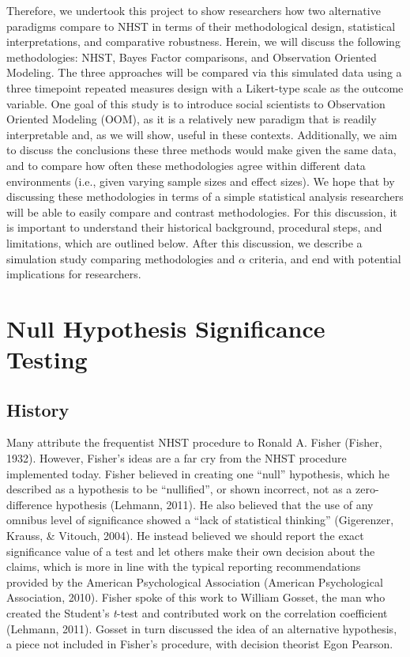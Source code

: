 \documentclass[english,mask,man]{apa6}
\theoremstyle{definition}
\theoremstyle{definition}
\theoremstyle{definition}
\theoremstyle{remark}
\begin{document}
Therefore, we undertook this project to show researchers how two
alternative paradigms compare to NHST in terms of their methodological
design, statistical interpretations, and comparative robustness. Herein,
we will discuss the following methodologies: NHST, Bayes Factor
comparisons, and Observation Oriented Modeling. The three approaches
will be compared via this simulated data using a three timepoint
repeated measures design with a Likert-type scale as the outcome
variable. One goal of this study is to introduce social scientists to
Observation Oriented Modeling (OOM), as it is a relatively new paradigm
that is readily interpretable and, as we will show, useful in these
contexts. Additionally, we aim to discuss the conclusions these three
methods would make given the same data, and to compare how often these
methodologies agree within different data environments (i.e., given
varying sample sizes and effect sizes). We hope that by discussing these
methodologies in terms of a simple statistical analysis researchers will
be able to easily compare and contrast methodologies. For this
discussion, it is important to understand their historical background,
procedural steps, and limitations, which are outlined below. After this
discussion, we describe a simulation study comparing methodologies and
\(\alpha\) criteria, and end with potential implications for
researchers.

\section{Null Hypothesis Significance
Testing}\label{null-hypothesis-significance-testing}

\subsection{History}\label{history}

Many attribute the frequentist NHST procedure to Ronald A. Fisher
(Fisher, 1932). However, Fisher's ideas are a far cry from the NHST
procedure implemented today. Fisher believed in creating one
\enquote{null} hypothesis, which he described as a hypothesis to be
\enquote{nullified}, or shown incorrect, not as a zero-difference
hypothesis (Lehmann, 2011). He also believed that the use of any omnibus
level of significance showed a \enquote{lack of statistical thinking}
(Gigerenzer, Krauss, \& Vitouch, 2004). He instead believed we should
report the exact significance value of a test and let others make their
own decision about the claims, which is more in line with the typical
reporting recommendations provided by the American Psychological
Association (American Psychological Association, 2010). Fisher spoke of
this work to William Gosset, the man who created the Student's
\emph{t}-test and contributed work on the correlation coefficient
(Lehmann, 2011). Gosset in turn discussed the idea of an alternative
hypothesis, a piece not included in Fisher's procedure, with decision
theorist Egon Pearson.
\end{document}

